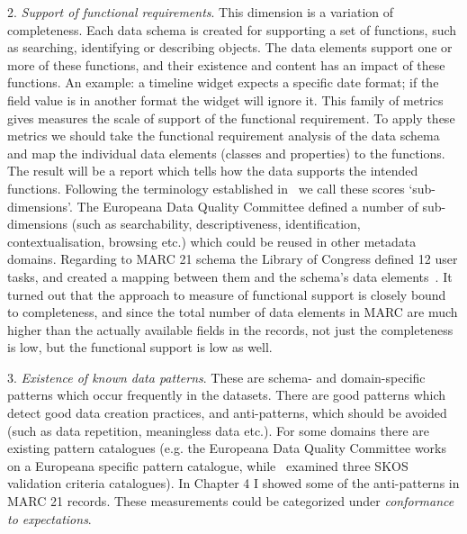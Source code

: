 2. \emph{Support of functional requirements}. This dimension is a variation of completeness. Each data schema is created for supporting a set of functions, such as searching, identifying or describing objects. The data elements support one or more of these functions, and their existence and content has an impact of these functions. An example: a timeline widget expects a specific date format; if the field value is in another format the widget will ignore it. This family of metrics gives measures the scale of support of the functional requirement. To apply these metrics we should take the functional requirement analysis of the data schema and map the individual data elements (classes and properties) to the functions. The result will be a report which tells how the data supports the intended functions. Following the terminology established in~\cite{gavrilis2015} we call these scores `sub-dimensions’. The Europeana Data Quality Committee defined a number of sub-dimensions (such as searchability, descriptiveness, identification, contextualisation, browsing etc.) which could be reused in other metadata domains. Regarding to MARC 21 schema the Library of Congress defined 12 user tasks, and created a mapping between them and the schema's data elements~\cite{delsey2003, loc2006}. It turned out that the approach to measure of functional support is closely bound to completeness, and since the total number of data elements in MARC are much higher than the actually available fields in the records, not just the completeness is low, but the functional support is low as well.

3. \emph{Existence of known data patterns}. These are schema- and domain-specific patterns which occur frequently in the datasets. There are good patterns which detect good data creation practices, and anti-patterns, which should be avoided (such as data repetition, meaningless data etc.). For some domains there are existing pattern catalogues (e.g. the Europeana Data Quality Committee works on a Europeana specific pattern catalogue, while~\cite{suominen2012}  examined three SKOS validation criteria catalogues). In Chapter 4 I showed some of the anti-patterns in MARC 21 records. These measurements could be categorized under \emph{conformance to expectations}.


